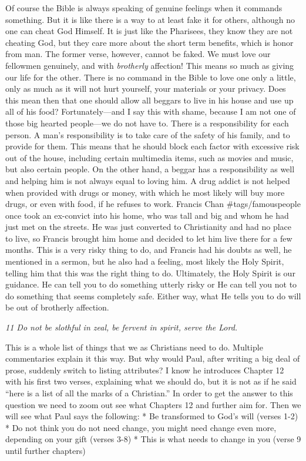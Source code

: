 Of course the Bible is always speaking of genuine feelings when it
commands something. But it is like there is a way to at least fake it
for others, although no one can cheat God Himself. It is just like the
Pharisees, they know they are not cheating God, but they care more about
the short term benefits, which is honor from man. The former verse,
however, cannot be faked. We must love our fellowmen genuinely, and with
\emph{brotherly} affection! This means so much as giving our life for
the other. There is no command in the Bible to love one only a little,
only as much as it will not hurt yourself, your materials or your
privacy. Does this mean then that one should allow all beggars to live
in his house and use up all of his food? Fortunately---and I say this
with shame, because I am not one of those big hearted people---we do not
have to. There is a responsibility for each person. A man's
responsibility is to take care of the safety of his family, and to
provide for them. This means that he should block each factor with
excessive risk out of the house, including certain multimedia items,
such as movies and music, but also certain people. On the other hand, a
beggar has a responsibility as well and helping him is not always equal
to loving him. A drug addict is not helped when provided with drugs or
money, with which he most likely will buy more drugs, or even with food,
if he refuses to work. Francis Chan \#tags/famouspeople once took an
ex-convict into his home, who was tall and big and whom he had just met
on the streets. He was just converted to Christianity and had no place
to live, so Francis brought him home and decided to let him live there
for a few months. This is a very risky thing to do, and Francis had his
doubts as well, he mentioned in a sermon, but he also had a feeling,
most likely the Holy Spirit, telling him that this was the right thing
to do. Ultimately, the Holy Spirit is our guidance. He can tell you to
do something utterly risky or He can tell you not to do something that
seems completely safe. Either way, what He tells you to do will be out
of brotherly affection.

\emph{11 Do not be slothful in zeal, be fervent in spirit, serve the
Lord.}

This is a whole list of things that we as Christians need to do.
Multiple commentaries explain it this way. But why would Paul, after
writing a big deal of prose, suddenly switch to listing attributes? I
know he introduces Chapter 12 with his first two verses, explaining what
we should do, but it is not as if he said ``here is a list of all the
marks of a Christian.'' In order to get the answer to this question we
need to zoom out see what Chapters 12 and further aim for. Then we will
see what Paul says the following: * Be transformed to God's will (verses
1-2) * Do not think you do not need change, you might need change even
more, depending on your gift (verses 3-8) * This is what needs to change
in you (verse 9 until further chapters)

